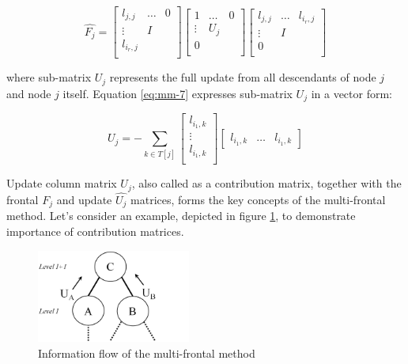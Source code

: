 \begin{equation} \label{eq:mm-6}
\hat{F_{j}} = \begin{bmatrix}
l_{j,j} & \dots & 0 \\
\vdots & I \\
l_{i_{r},j} \\
\end{bmatrix} 
\begin{bmatrix}
1 & \dots & 0 \\
\vdots & U_{j} \\
0 \\
\end{bmatrix} 
\begin{bmatrix}
l_{j,j} & \dots & l_{i_{r},j} \\
\vdots & I \\
0 \\
\end{bmatrix} 
\end{equation}

where sub-matrix $U_{j}$ represents the full update from all descendants of node $j$ and node $j$ itself. Equation \ref{eq:mm-7} expresses sub-matrix $U_{j}$ in a vector form: 

\begin{equation} \label{eq:mm-7}
U_{j} = - \sum_{k \in T[j]}  \begin{bmatrix}
l_{i_1,k} \\
\vdots \\
l_{i_1,k} \\
\end{bmatrix} \begin{bmatrix}
l_{i_1,k} & \dots & l_{i_1,k}
\end{bmatrix}
\end{equation}


Update column matrix $U_{j}$, also called as a contribution matrix, together with the frontal $F_{j}$ and update $\hat{U_j}$ matrices, forms the key concepts of the multi-frontal method. Let's consider an example, depicted in figure \ref{fig:information-float}, to demonstrate importance of contribution matrices.\\



\figpointer{\ref{fig:information-float}}
\begin{figure}[htpb]
  \centering
  \includegraphics[width=0.45\textwidth]{figures/chapter-2/information-flow.png}
\caption{Information flow of the multi-frontal method}
\label{fig:information-float}
\end{figure}


